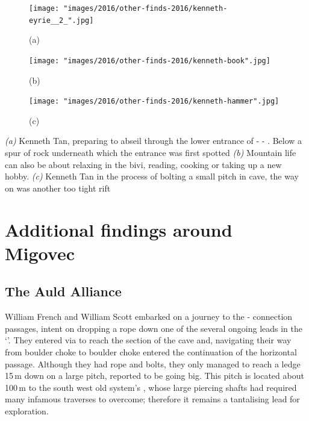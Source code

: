 \begin{pagefigure}
\checkoddpage \ifoddpage \forcerectofloat \else \forceversofloat \fi
\centering

    \begin{subfigure}[t]{0.5435\textwidth}
        \centering
        \texttt{[image: "images/2016/other-finds-2016/kenneth-eyrie\_\_2\_".jpg]} 
        \caption{(a)} \label{moon door}
    \end{subfigure}
        \hfill
\begin{subfigure}[t]{0.4465\textwidth}
\centering
\texttt{[image: "images/2016/other-finds-2016/kenneth-book".jpg]}
 \caption{(b)}\label{reading in the bivi}
\end{subfigure}
    \vspace{0cm}
    \begin{subfigure}[t]{\textwidth}
    \centering
        \texttt{[image: "images/2016/other-finds-2016/kenneth-hammer".jpg]} 
        \caption{(c)} \label{hammer in B9}
    \end{subfigure}
    \caption{
    \emph{(a)}  Kenneth Tan, preparing to abseil through the lower entrance of \protect{} - \protect{} - \protect{}. Below a spur of rock underneath which the \protect{} entrance was first spotted 
     \emph{(b)} Mountain life can also be about relaxing in the bivi, reading, cooking or taking up a new hobby.
     \emph{(c)}  Kenneth Tan in the process of bolting a small pitch in \protect{} cave, the way on was another too tight rift }
\end{pagefigure}
\clearpage

\section{Additional findings around Migovec}

\subsection{The Auld Alliance}
William French and William Scott embarked on a journey to the - connection passages, intent on dropping a rope down one of the several ongoing leads in the `'. They entered via  to reach the  section of the cave and, navigating their way from boulder choke to boulder choke entered the continuation of the horizontal passage. Although they had rope and bolts, they only managed to reach a ledge 15\,m down on a large pitch, reported to be going big. This pitch is located  about 100\,m to the south west old system's , whose large piercing shafts had required many infamous traverses to overcome; therefore it remains a tantalising lead for exploration.





